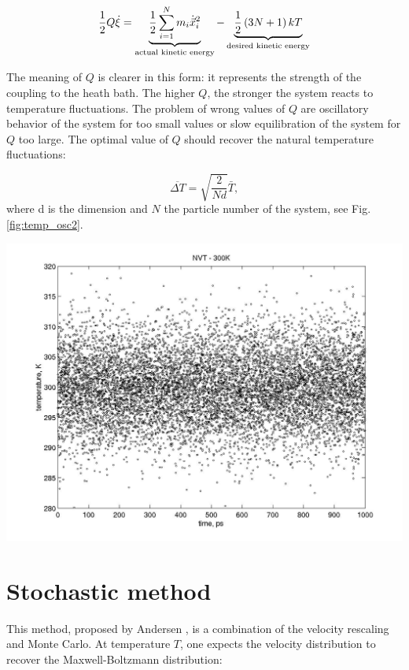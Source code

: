 \begin{equation}
\frac{1}{2}Q \dot{\xi} =\underbrace{ \frac{1}{2} \sum^N_{i=1}{ m_i\dot{\vec{x}}_i^2 }}_{\text{actual kinetic energy}}  -  \underbrace{\frac{1}{2}\left(3N+1\right)kT }_{\text{desired kinetic energy}}  
\label{eq:nos_motion4}
\end{equation}

The meaning of $Q$ is clearer in this form: it represents the strength of the coupling to the heath bath. The higher $Q$, the stronger the system reacts to temperature fluctuations. The problem of  wrong values of $Q$ are oscillatory behavior of the system for too small values or slow equilibration of the system for $Q$ too large. The optimal value of $Q$ should recover the natural temperature fluctuations:

\begin{equation}
\overline{\Delta T} = \sqrt{\frac{2}{N d}} \bar{T},
\end{equation}
where d is the dimension and $N$ the particle number of the system, see Fig. \ref{fig:temp_osc2}. 

\begin{center}
	\includegraphics[width=.85\textwidth]{pics/temp_osc2.jpeg}
	\label{fig:temp_osc2}
\end{center}




\section{Stochastic method}

This method, proposed by Andersen \citep{andersen_thermostat}, is a combination of the velocity rescaling and Monte Carlo. At temperature $T$, one expects the velocity distribution to recover the Maxwell-Boltzmann distribution:

